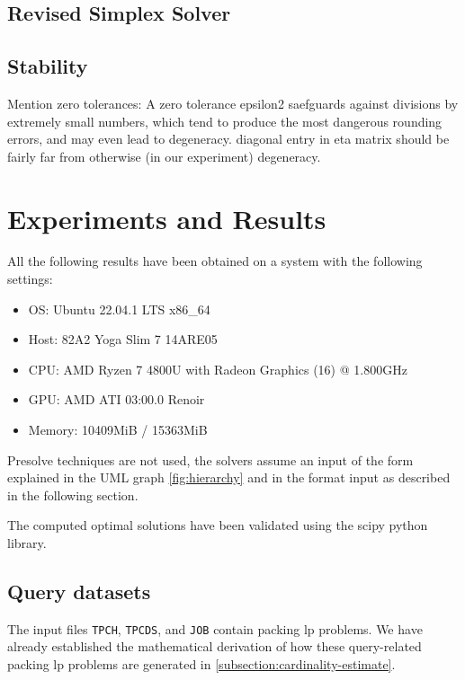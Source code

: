 \subsection{Revised Simplex Solver}


\subsection{Stability}
Mention zero tolerances: A zero tolerance epsilon2 saefguards against divisions
by extremely small numbers, which tend to produce the most dangerous rounding errors, and
may even lead to degeneracy. diagonal entry in eta matrix should be fairly far from
otherwise (in our experiment) degeneracy.


\section{Experiments and Results}
All the following results have been obtained on a system with the following settings:
\begin{itemize}
    \item OS: Ubuntu 22.04.1 LTS x86\_64
    \item Host: 82A2 Yoga Slim 7 14ARE05

    \item CPU: AMD Ryzen 7 4800U with Radeon Graphics (16) @ 1.800GHz
    \item GPU: AMD ATI 03:00.0 Renoir
    \item Memory: 10409MiB / 15363MiB
\end{itemize}

Presolve techniques are not used, the solvers assume an input of the form explained
in the UML graph \ref{fig:hierarchy} and in the format input as described in the following section.

The computed optimal solutions have been validated using the scipy python library.

\subsection{Query datasets}
The input files \texttt{TPCH}, \texttt{TPCDS}, and \texttt{JOB} contain packing
\gls{lp} problems. We have already established the mathematical derivation of how
these query-related packing
\gls{lp} problems are generated in \ref{subsection:cardinality-estimate}.

